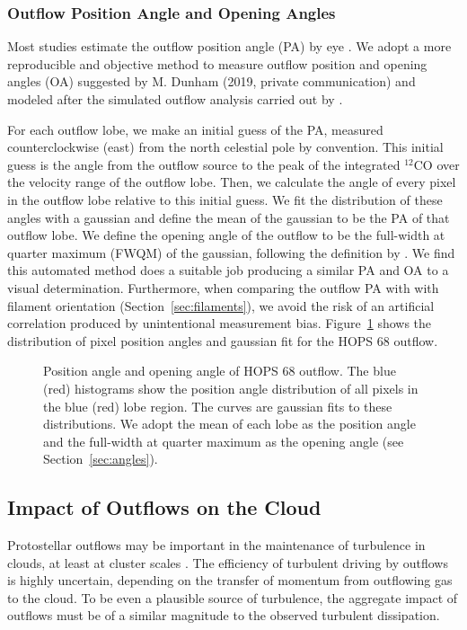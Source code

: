 \documentclass[twocolumn]{aastex63}
\newcommand{\example}{HOPS 68}
\newcommand{\co}[1][]{\ensuremath{^{#1}}CO}
\begin{document}
\subsubsection{Outflow Position Angle and Opening Angles\label{sec:angles}}
Most studies estimate the outflow position angle (PA) by eye \citep[e.g.][]{Morgan91,Takahashi08,Plunkett13,Stephens17,Kong19,Tanabe:submitted}. We adopt a more reproducible and objective method to measure outflow position and opening angles (OA)  suggested by M. Dunham (2019, private communication) and modeled after the simulated outflow analysis carried out by \citet{Offner11}.

For each outflow lobe, we make an initial guess of the PA, measured counterclockwise (east) from the north celestial pole by convention. This initial guess is the angle from the outflow source to the peak of the integrated \co[12]{} over the velocity range of the outflow lobe. Then, we calculate the angle of every pixel in the outflow lobe relative to this initial guess. We fit the distribution of these angles with a gaussian and define the mean of the gaussian to be the PA of that outflow lobe. We define the opening angle of the outflow to be the full-width at quarter maximum (FWQM) of the gaussian, following the definition by \cite{Offner11}. We find this automated method does a suitable job producing a similar PA and OA to a visual determination. Furthermore, when comparing the outflow PA with with filament orientation (Section~\ref{sec:filaments}), we avoid the risk of an artificial correlation produced by unintentional measurement bias. Figure~\ref{fig:angles} shows the distribution of pixel position angles and gaussian fit for the \example{} outflow.

\begin{figure}
\caption{Position angle and opening angle of \example{} outflow. The blue (red) histograms show the position angle distribution of all pixels in the blue (red) lobe region. The curves are gaussian fits to these distributions. We adopt the mean of each lobe as the position angle and the full-width at quarter maximum as the opening angle (see Section~\ref{sec:angles}).\label{fig:angles}}
\end{figure}


\subsection{Impact of Outflows on the Cloud}\label{sec:impact}
Protostellar outflows may be important in the maintenance of turbulence in clouds, at least at cluster scales \citep{Nakamura07}. The efficiency of turbulent driving by outflows is highly uncertain, depending on the transfer of momentum from outflowing gas to the cloud. To be even a plausible source of turbulence, the aggregate impact of outflows must be of a similar magnitude to the observed turbulent dissipation.
\end{document}
